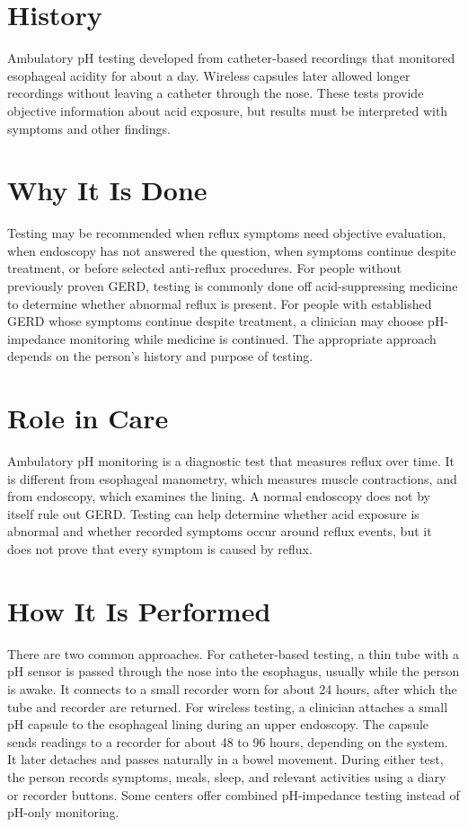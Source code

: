 \section*{History}
Ambulatory pH testing developed from catheter-based recordings that monitored esophageal acidity for about a day. Wireless capsules later allowed longer recordings without leaving a catheter through the nose. These tests provide objective information about acid exposure, but results must be interpreted with symptoms and other findings.

\section*{Why It Is Done}
Testing may be recommended when reflux symptoms need objective evaluation, when endoscopy has not answered the question, when symptoms continue despite treatment, or before selected anti-reflux procedures. For people without previously proven GERD, testing is commonly done off acid-suppressing medicine to determine whether abnormal reflux is present. For people with established GERD whose symptoms continue despite treatment, a clinician may choose pH-impedance monitoring while medicine is continued. The appropriate approach depends on the person's history and purpose of testing.

\section*{Role in Care}
Ambulatory pH monitoring is a diagnostic test that measures reflux over time. It is different from esophageal manometry, which measures muscle contractions, and from endoscopy, which examines the lining. A normal endoscopy does not by itself rule out GERD. Testing can help determine whether acid exposure is abnormal and whether recorded symptoms occur around reflux events, but it does not prove that every symptom is caused by reflux.

\section*{How It Is Performed}
There are two common approaches. For catheter-based testing, a thin tube with a pH sensor is passed through the nose into the esophagus, usually while the person is awake. It connects to a small recorder worn for about 24 hours, after which the tube and recorder are returned. For wireless testing, a clinician attaches a small pH capsule to the esophageal lining during an upper endoscopy. The capsule sends readings to a recorder for about 48 to 96 hours, depending on the system. It later detaches and passes naturally in a bowel movement. During either test, the person records symptoms, meals, sleep, and relevant activities using a diary or recorder buttons. Some centers offer combined pH-impedance testing instead of pH-only monitoring.

